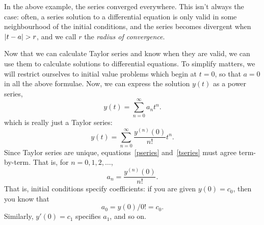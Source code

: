 \documentclass[10pt,driverfallback=hypertex]{report}
\begin{document}
In the above example, the series converged everywhere. This isn't always
the case: often, a series solution to a differential equation is only
valid in some neighbourhood of the initial conditions, and the series
becomes divergent when $\left|t-a\right| > r$, and we call $r$ the \emph{radius of
convergence}.

%

Now that we can calculate Taylor series and know when they are valid,
we can use them to calculate solutions to differential equations. To
simplify matters, we will restrict ourselves to initial value problems
which begin at $t=0$, so that $a=0$ in all the above formulae. Now, we
can express the solution $y(t)$ as a power series,
\begin{dmath}
  \label{pseries}
  y(t) = \sum_{n=0}^\infty a_n t^n .
\end{dmath}
which is really just a Taylor series:
\begin{dmath}
  \label{tseries}
  y(t) = \sum_{n=0}^\infty \frac{y^{(n)}(0)}{n!} t^n .
\end{dmath}
Since Taylor series are unique, equations~\eqref{pseries}
and~\eqref{tseries} must agree term-by-term.  That is, for
$n=0,1,2,\dots$,
\begin{dmath*}
  a_n = \frac{y^{(n)}(0)}{n!}.
\end{dmath*}
That is, initial conditions specify coefficients: if you are given
$y(0)=c_0$, then you know that 
\begin{dmath*}
  a_0 = y(0)/0! = c_0.
\end{dmath*}
 Similarly, $y'(0)=c_1$ specifies $a_1$, and so on.
\end{document}
